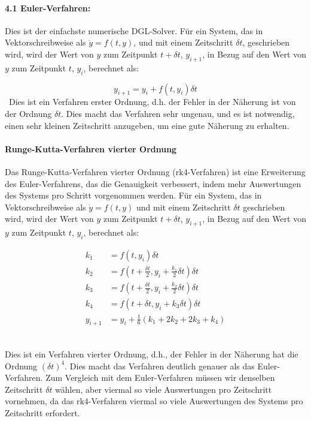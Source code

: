 \documentclass[a4paper,12pt,twoside]{article}
\begin{document}
\paragraph{4.1 Euler-Verfahren: }
Dies ist der einfachste numerische DGL-Solver. Für ein System, das in Vektorschreibweise als $ \dot{y} = f(t, y) $, und mit einem Zeitschritt $\delta t$, geschrieben wird, wird der Wert von $y$ zum Zeitpunkt $t + \delta t$, $y_{i+1}$, in Bezug auf den Wert von $y$ zum Zeitpunkt $t$, $y_i$, berechnet als:

\begin{equation*}
    y_{i+1} = y_i + f(t, y_i)\delta t
\end{equation*}
~\cite{Zhou&Long2018}Dies ist ein Verfahren erster Ordnung, d.h. der Fehler in der Näherung ist von der Ordnung $\delta t$. Dies macht das Verfahren sehr ungenau, und es ist notwendig, einen sehr kleinen Zeitschritt anzugeben, um eine gute Näherung zu erhalten.


\paragraph{Runge-Kutta-Verfahren vierter Ordnung}
Das Runge-Kutta-Verfahren vierter Ordnung (rk4-Verfahren) ist eine Erweiterung des Euler-Verfahrens, das die Genauigkeit verbessert, indem mehr Auswertungen des Systems pro Schritt vorgenommen werden. Für ein System, das in Vektorschreibweise als $\dot{y} = f(t, y)$ und mit einem Zeitschritt $\delta t$ geschrieben wird, wird der Wert von $y$ zum Zeitpunkt $t + \delta t$, $y_{i+1}$, in Bezug auf den Wert von $y$ zum Zeitpunkt $t$, $y_i$, berechnet als:

\begin{align*}
    k_1 &= f(t, y_i)\delta t \\
    k_2 &= f\left(t + \frac{\delta t}{2}, y_i + \frac{k_1}{2} \delta t \right) \delta t \\
    k_3 &= f\left(t + \frac{\delta t}{2}, y_i + \frac{k_2}{2} \delta t \right) \delta t \\
    k_4 &= f(t + \delta t, y_i + k_3 \delta t) \delta t \\
    y_{i+1} &= y_i + \frac{1}{6}(k_1 + 2k_2 + 2k_3 + k_4)
\end{align*}~\cite{Swarthmore2005}

Dies ist ein Verfahren vierter Ordnung, d.h., der Fehler in der Näherung hat die Ordnung $(\delta t)^4$. Dies macht das Verfahren deutlich genauer als das Euler-Verfahren. Zum Vergleich mit dem Euler-Verfahren müssen wir denselben Zeitschritt $\delta t$ wählen, aber viermal so viele Auswertungen pro Zeitschritt vornehmen, da das rk4-Verfahren viermal so viele Auswertungen des Systems pro Zeitschritt erfordert.
\end{document}
